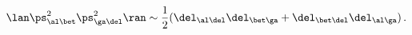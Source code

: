 \begin{equation}
\lan \ps^2_{\al\bet}\ps^2_{\ga\del}\ran \sim \frac{1}{2} (\del_{\al\del}\del%
_{\bet\ga} + \del_{\bet\del}\del_{\al\ga})\, .
\end{equation}


